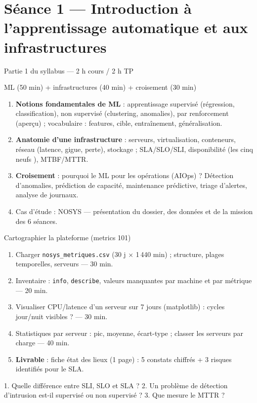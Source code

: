 \documentclass[11pt,a4paper]{article}
\begin{document}
\newpage
\section*{Séance 1 — Introduction à l'apprentissage automatique et aux infrastructures}
\begin{seancebox}{Partie 1 du syllabus — 2 h cours / 2 h TP}
\end{seancebox}
\begin{coursbox}{ML (50 min) + infrastructures (40 min) + croisement (30 min)}
\begin{enumerate}[nosep]
\item \textbf{Notions fondamentales de ML} : apprentissage supervisé (régression, classification), non supervisé (clustering, anomalies), par renforcement (aperçu) ; vocabulaire : features, cible, entraînement, généralisation.
\item \textbf{Anatomie d'une infrastructure} : serveurs, virtualisation, conteneurs, réseau (latence, gigue, perte), stockage ; SLA/SLO/SLI, disponibilité (les \og cinq neufs \fg{}), MTBF/MTTR.
\item \textbf{Croisement} : pourquoi le ML pour les opérations (AIOps) ? Détection d'anomalies, prédiction de capacité, maintenance prédictive, triage d'alertes, analyse de journaux.
\item Cas d'étude : NOSYS — présentation du dossier, des données et de la mission des 6 séances.
\end{enumerate}
\end{coursbox}
\begin{tpbox}{Cartographier la plateforme (metrics 101)}
\begin{enumerate}[nosep]
\item Charger \texttt{nosys\_metriques.csv} (30 j × 1\,440 min) ; structure, plages temporelles, serveurs — 30 min.
\item Inventaire : \texttt{info}, \texttt{describe}, valeurs manquantes par machine et par métrique — 20 min.
\item Visualiser CPU/latence d'un serveur sur 7 jours (matplotlib) : cycles jour/nuit visibles ? — 30 min.
\item Statistiques par serveur : pic, moyenne, écart-type ; classer les serveurs par charge — 40 min.
\item \textbf{Livrable} : fiche \og état des lieux \fg{} (1 page) : 5 constats chiffrés + 3 risques identifiés pour le SLA.
\end{enumerate}
\end{tpbox}
\begin{evalbox}
1. Quelle différence entre SLI, SLO et SLA ? 2. Un problème de détection d'intrusion est-il supervisé ou non supervisé ? 3. Que mesure le MTTR ?
\end{evalbox}
\end{document}

